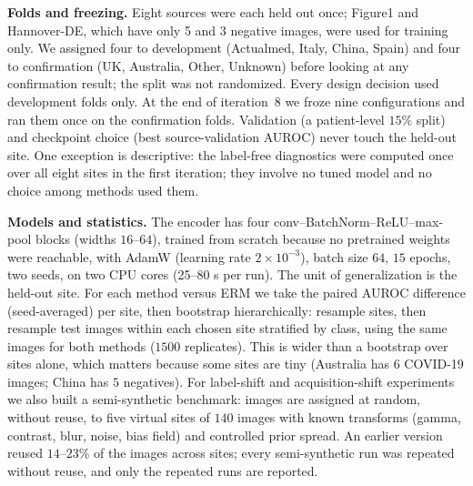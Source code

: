 \documentclass[10pt]{article}
\newcommand{\erm}{ERM}
\begin{document}
\textbf{Folds and freezing.} Eight sources were each held out once; Figure1 and Hannover-DE, which have only 5 and 3 negative images, were used for training only. We assigned four to development (Actualmed, Italy, China, Spain) and four to confirmation (UK, Australia, Other, Unknown) before looking at any confirmation result; the split was not randomized. Every design decision used development folds only. At the end of iteration~8 we froze nine configurations and ran them once on the confirmation folds. Validation (a patient-level $15\%$ split) and checkpoint choice (best source-validation AUROC) never touch the held-out site. One exception is descriptive: the label-free diagnostics were computed once over all eight sites in the first iteration; they involve no tuned model and no choice among methods used them.

\textbf{Models and statistics.} The encoder has four conv--BatchNorm--ReLU--max-pool blocks (widths $16$--$64$), trained from scratch because no pretrained weights were reachable, with AdamW (learning rate $2\times10^{-3}$), batch size $64$, $15$ epochs, two seeds, on two CPU cores (25--80 s per run). The unit of generalization is the held-out site. For each method versus \erm{} we take the paired AUROC difference (seed-averaged) per site, then bootstrap hierarchically: resample sites, then resample test images within each chosen site stratified by class, using the same images for both methods ($1500$ replicates). This is wider than a bootstrap over sites alone, which matters because some sites are tiny (Australia has $6$ COVID-19 images; China has $5$ negatives). For label-shift and acquisition-shift experiments we also built a semi-synthetic benchmark: images are assigned at random, without reuse, to five virtual sites of $140$ images with known transforms (gamma, contrast, blur, noise, bias field) and controlled prior spread. An earlier version reused $14$--$23\%$ of the images across sites; every semi-synthetic run was repeated without reuse, and only the repeated runs are reported.
\end{document}
